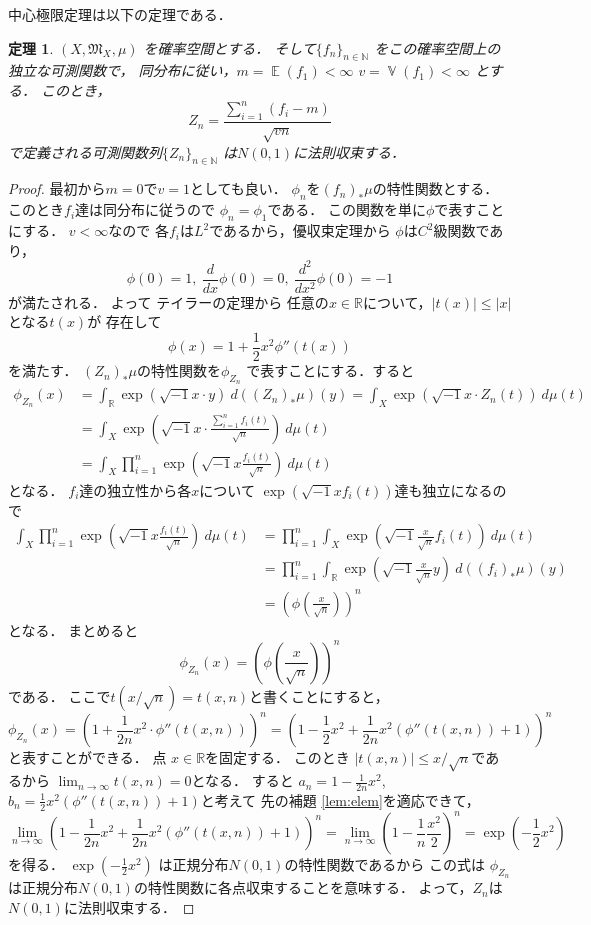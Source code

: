 \documentclass[leqno, 12pt]{jsarticle}
\newtheorem{thm}{定理}
\newcommand{\nn}{\mathbb{N}}
\newcommand{\rr}{\mathbb{R}}
\DeclareMathOperator{\mean}{\mathbb{E}}
\DeclareMathOperator{\varian}{\mathbb{V}}
\begin{document}
中心極限定理は以下の定理である．
\begin{thm}
$(X, \mathfrak{M}_X, \mu)$
を確率空間とする．
そして$\{f_n\}_{n\in \nn}$
をこの確率空間上の独立な可測関数で，
同分布に従い，$m=\mean(f_1)<\infty$
$v=\varian(f_1)<\infty$
とする．
このとき，
\[
Z_n=\frac{\sum_{i=1}^n(f_i-m)}{\sqrt{vn}}
\]
で定義される可測関数列$\{Z_n\}_{n\in \nn}$
は$N(0, 1)$に法則収束する．
\end{thm}
\begin{proof}
最初から$m=0$で$v=1$としても良い．
$\phi_n$を$(f_n)_*\mu$の特性関数とする．
このとき$f_i$達は同分布に従うので
$\phi_n=\phi_1$である．
この関数を単に$\phi$で表すことにする．
$v<\infty$なので
各$f_i$は$L^2$であるから，優収束定理から
$\phi$は$C^2$級関数であり，
\[
\phi(0)=1, \ \frac{d}{dx}\phi(0)=0, \ \frac{d^2}{dx^2}\phi(0)=-1
\]
が満たされる．
よって
テイラーの定理から
任意の$x\in \rr$について，$|t(x)|\le |x|$となる$t(x)$が
存在して
\[
\phi(x)=1+\frac{1}{2}x^2\phi''(t(x))
\]
を満たす．
$(Z_{n})_{*}\mu$の特性関数を$\phi_{Z_{n}}$
で表すことにする．すると
\begin{align*}
\phi_{Z_n}(x)
&=
 	\int_{\rr}
	\exp(\sqrt{-1}x\cdot y)\ 
	d((Z_{n})_{*}\mu) (y)
	=
	\int_{X}
	\exp(\sqrt{-1}x\cdot Z_{n}(t))\ 
	d\mu (t)\\
	&=
	\int_{X}
	\exp\left(\sqrt{-1}x\cdot \frac{\sum_{i=1}^nf_{i}(t)}{\sqrt{n}}\right)\ 
	d\mu (t)\\
	&=
	\int_{X}
	\prod_{i=1}^{n}\exp\left(\sqrt{-1}x\frac{f_{i}(t)}{\sqrt{n}}\right)
	\ d\mu(t)
\end{align*}
となる．
$f_{i}$達の独立性から各$x$について
$\exp\left(\sqrt{-1}x f_{i}(t)\right)$達も独立になるので
\begin{align*}
	\int_{X}
	\prod_{i=1}^{n}\exp\left(\sqrt{-1}x\frac{f_{i}(t)}{\sqrt{n}}\right)
	\ d\mu(t)
	&=
	\prod_{i=1}^{n}\int_{X}
	\exp\left(\sqrt{-1}\frac{x}{\sqrt{n}}f_{i}(t)\right)
	\ d\mu(t)\\
	&=
	\prod_{i=1}^{n}\int_{\rr}
	\exp\left(\sqrt{-1}\frac{x}{\sqrt{n}}y\right)
	\ d((f_{i})_{*}\mu)(y)\\
	&=
	\left(\phi\left(\frac{x}{\sqrt{n}}\right)\right)^{n}
\end{align*}
となる．
まとめると
\[
\phi_{Z_n}(x)=\left(\phi\left(\frac{x}{\sqrt{n}}\right)\right)^n
\]
である．
ここで$t(x/\sqrt{n})=t(x, n)$と書くことにすると，
\[
	\phi_{Z_n}(x)=\left(1+\frac{1}{2n}x^2\cdot\phi''(t(x, n))\right)^n
	=
	\left(1-\frac{1}{2}x^2+\frac{1}{2n}x^2(\phi''(t(x, n))+1)\right)^n
\]
と表すことができる．
点
$x\in \rr$を固定する．
このとき
$|t(x, n)|\le x/\sqrt{n}$であるから
$\lim_{n\to \infty}t(x, n)= 0$となる．
すると
$a_n=1-\frac{1}{2n}x^2$,
$b_n=\frac{1}{2}x^2(\phi''(t(x, n))+1)$と考えて
先の補題 \ref{lem:elem}を適応できて，
\[
	\lim_{n\to \infty}
	\left(
	1-\frac{1}{2n}x^2+\frac{1}{2n}x^2(\phi''(t(x, n))+1)
	\right)^n
	=
	\lim_{n\to \infty}
	\left(
	1-\frac{1}{n}\frac{x^2}{2}
	\right)^n
	=\exp\left(-\frac{1}{2}x^2\right)
\]
を得る．
$\exp\left(-\frac{1}{2}x^2\right)$
は正規分布$N(0, 1)$の特性関数であるから
この式は
$\phi_{Z_n}$
は正規分布$N(0, 1)$の特性関数に各点収束することを意味する．
よって，$Z_n$は$N(0, 1)$に法則収束する．
\end{proof}
\end{document}
